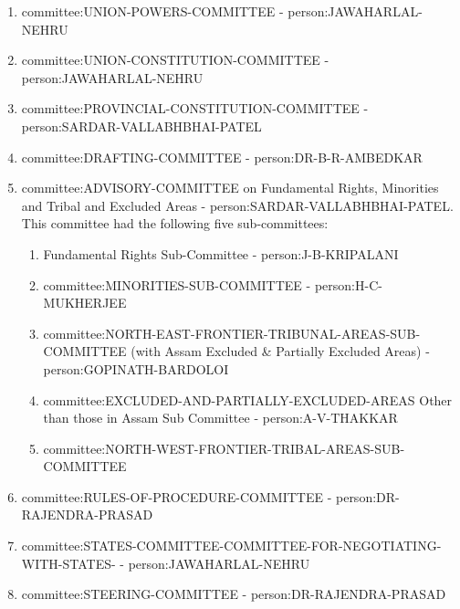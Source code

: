 \begin{enumerate}
  \item \gls{committee:UNION-POWERS-COMMITTEE} - \gls{person:JAWAHARLAL-NEHRU}
  \item \gls{committee:UNION-CONSTITUTION-COMMITTEE} - \gls{person:JAWAHARLAL-NEHRU}
  \item \gls{committee:PROVINCIAL-CONSTITUTION-COMMITTEE} - \gls{person:SARDAR-VALLABHBHAI-PATEL}
  \item \gls{committee:DRAFTING-COMMITTEE} - \gls{person:DR-B-R-AMBEDKAR}
  \item \gls{committee:ADVISORY-COMMITTEE} on Fundamental Rights, Minorities and Tribal and Excluded Areas - \gls{person:SARDAR-VALLABHBHAI-PATEL}. This committee had the following five sub-committees:
  \begin{enumerate}
    \item Fundamental Rights Sub-Committee - \gls{person:J-B-KRIPALANI}
    \item \gls{committee:MINORITIES-SUB-COMMITTEE} - \gls{person:H-C-MUKHERJEE}
    \item \gls{committee:NORTH-EAST-FRONTIER-TRIBUNAL-AREAS-SUB-COMMITTEE} (with Assam Excluded \& Partially Excluded Areas) - \gls{person:GOPINATH-BARDOLOI}
    \item \gls{committee:EXCLUDED-AND-PARTIALLY-EXCLUDED-AREAS} Other than those in Assam Sub Committee - \gls{person:A-V-THAKKAR}
    \item \gls{committee:NORTH-WEST-FRONTIER-TRIBAL-AREAS-SUB-COMMITTEE}
  \end{enumerate}
  
  \item \gls{committee:RULES-OF-PROCEDURE-COMMITTEE} - \gls{person:DR-RAJENDRA-PRASAD}
  \item \gls{committee:STATES-COMMITTEE-COMMITTEE-FOR-NEGOTIATING-WITH-STATES-} - \gls{person:JAWAHARLAL-NEHRU}
  \item \gls{committee:STEERING-COMMITTEE} - \gls{person:DR-RAJENDRA-PRASAD}
\end{enumerate}

